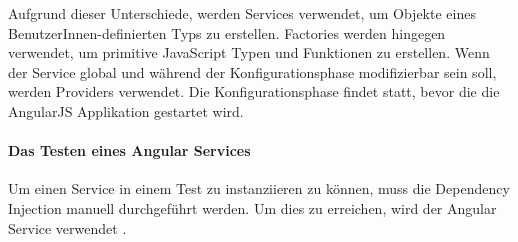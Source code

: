 Aufgrund dieser Unterschiede, werden Services verwendet, um Objekte eines BenutzerInnen-definierten Typs zu erstellen. Factories werden hingegen verwendet, um primitive JavaScript Typen und Funktionen zu erstellen. Wenn der Service global und während der Konfigurationsphase modifizierbar sein soll, werden Providers verwendet. Die Konfigurationsphase findet statt, bevor die die AngularJS Applikation gestartet wird.

\paragraph{Das Testen eines Angular Services}
Um einen Service in einem Test zu instanziieren zu können, muss die Dependency Injection manuell durchgeführt werden. Um dies zu erreichen, wird der Angular Service  verwendet \autocite[\$injector]{Angular:APIRef}.

\newpage
